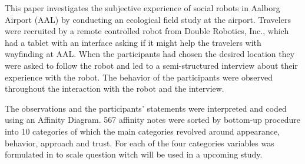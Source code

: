 \label{Abstract}
This paper investigates the subjective experience of social robots in Aalborg Airport (AAL) by conducting an ecological field study at the airport. Travelers were recruited by a remote controlled robot from Double Robotics, Inc., which had a tablet with an interface asking if it might help the travelers with wayfinding at AAL. When the participants had chosen the desired location they were asked to follow the robot and led to a semi-structured interview about their experience with the robot. The behavior of the participants were observed throughout the interaction with the robot and the interview. 

The observations and the participants' statements were interpreted and coded using an Affinity Diagram. 567 affinity notes were sorted by bottom-up procedure into 10 categories of which the main categories revolved around appearance, behavior, approach and trust. For each of the four categories variables was formulated in to scale question witch will be used in a upcoming study. 

